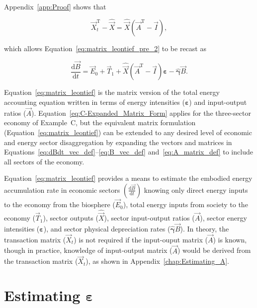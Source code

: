 \noindent{}Appendix~\ref{app:Proof} shows that

\begin{equation} \label{eq:Xdifference1}
	\vec{X}_{t}^{\mathrm{T}} 
	- \hat{\vec{X}} 
	= \hat{\vec{X}} (\vec{A}^{\mathrm{T}} - \vec{I}),
\end{equation}

\noindent{}which allows Equation~\ref{eq:matrix_leontief_pre_2}
to be recast as

\begin{equation} \label{eq:matrix_leontief}
	\frac{\mathrm{d}\vec{B}}{\mathrm{d}t} 
	= \vec{E}_{0}
	+ \vec{T}_{1}
	+ \hat{\vec{X}} (\vec{A}^{\mathrm{T}} - \vec{I})\bm{\varepsilon} 
	- \hat{\bm{\gamma}}\vec{B}.
\end{equation}

\noindent{}Equation~\ref{eq:matrix_leontief} is the matrix version 
of the total energy accounting equation
written in terms of energy intensities ($\bm{\varepsilon}$)
and input-output ratios ($\vec{A}$).
Equation~\ref{eq:C-Expanded_Matrix_Form} applies 
for the three-sector economy of Example~C, 
but the equivalent matrix formulation (Equation~\ref{eq:matrix_leontief}) 
can be extended to any desired level 
of economic and energy sector disaggregation 
by expanding the vectors and matrices in 
Equations~\ref{eq:dBdt_vec_def}--\ref{eq:B_vec_def}
and~\ref{eq:A_matrix_def} to include
all sectors of the economy.~\cite{Casler1984,Bullard:1978vd}

Equation~\ref{eq:matrix_leontief} provides a means to 
estimate the embodied energy accumulation rate
in economic sectors $\left(\frac{\mathrm{d}\vec{B}}{\mathrm{d}t}\right)$ 
knowing only 
direct energy inputs to the economy from the biosphere ($\vec{E}_{0}$), 
total energy inputs from society to the economy ($\vec{T}_{1}$),
sector outputs ($\hat{\vec{X}}$), 
sector input-output ratios ($\vec{A}$), 
sector energy intensities ($\bm{\varepsilon}$), 
and sector physical depreciation rates ($\hat{\bm{\gamma}}\vec{B}$). 
In theory, the transaction matrix ($\vec{X}_{t}$) is not required 
if the input-ouput matrix ($\vec{A}$) is known, 
though in practice, 
knowledge of input-output matrix ($\vec{A}$) 
would be derived from the transaction matrix ($\vec{X}_{t}$),
as shown in Appendix~\ref{chap:Estimating_A}.


\section{Estimating $\bm{\varepsilon}$}
\label{sec:estimating_epsilon-intensity_chapter}

